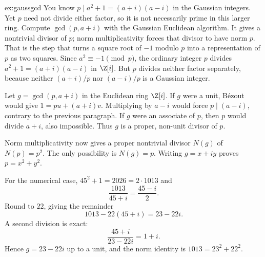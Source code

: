 \begin{solution}{ex:gaussgcd}
\idea You know $p\mid a^2+1=(a+i)(a-i)$ in the Gaussian integers. Yet $p$ need not divide either factor, so it is not necessarily prime in this larger ring. Compute $\gcd(p,a+i)$ with the Gaussian Euclidean algorithm. It gives a nontrivial divisor of $p$; norm multiplicativity forces that divisor to have norm $p$. That is the step that turns a square root of $-1$ modulo $p$ into a representation of $p$ as two squares.
\writeup Since $a^2\equiv-1\pmod p$, the ordinary integer $p$ divides $a^2+1=(a+i)(a-i)$ in $\Z[i]$. But $p$ divides neither factor separately, because neither $(a+i)/p$ nor $(a-i)/p$ is a Gaussian integer.

Let $g=\gcd(p,a+i)$ in the Euclidean ring $\Z[i]$. If $g$ were a unit, B\'ezout would give $1=pu+(a+i)v$. Multiplying by $a-i$ would force $p\mid(a-i)$, contrary to the previous paragraph. If $g$ were an associate of $p$, then $p$ would divide $a+i$, also impossible. Thus $g$ is a proper, non-unit divisor of $p$.

Norm multiplicativity now gives a proper nontrivial divisor $N(g)$ of $N(p)=p^2$. The only possibility is $N(g)=p$. Writing $g=x+iy$ proves $p=x^2+y^2$.

For the numerical case, $45^2+1=2026=2\cdot1013$ and
\[
\frac{1013}{45+i}=\frac{45-i}{2}.
\]
Round to $22$, giving the remainder
\[
1013-22(45+i)=23-22i.
\]
A second division is exact:
\[
\frac{45+i}{23-22i}=1+i.
\]
Hence $g=23-22i$ up to a unit, and the norm identity is
$1013=23^2+22^2$.
\end{solution}

